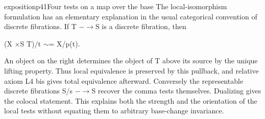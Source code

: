 \begin{dcomment}{exposition}{p41}{Four tests on a map over the base}
The local-isomorphism formulation has an elementary explanation in the usual categorical convention of discrete fibrations. If T \ensuremath{-}\ensuremath{\to}S is a discrete fibration, then

(X \ensuremath{\times}S T)/t \ensuremath{\sim}= X/p(t).

An object on the right determines the object of T above its source by the unique lifting property. Thus local equivalence is preserved by this pullback, and relative axiom L4 bis gives total equivalence afterward. Conversely the representable discrete fibrations S/s \ensuremath{-}\ensuremath{\to}S recover the comma tests themselves. Dualizing gives the colocal statement. This explains both the strength and the orientation of the local tests without equating them to arbitrary base-change invariance.

\end{dcomment}

